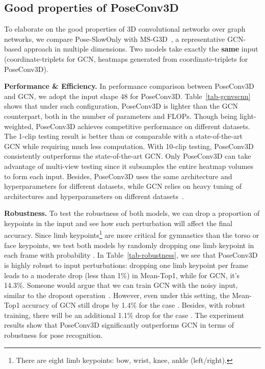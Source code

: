 \subsection{Good properties of PoseConv3D}
To elaborate on the good properties of 3D convolutional networks over graph networks, we compare Pose-SlowOnly with MS-G3D~\cite{liu2020disentangling}, a representative GCN-based approach in multiple dimensions.
Two models take exactly the \textbf{same} input (coordinate-triplets for GCN, heatmaps generated from coordinate-triplets for PoseConv3D). 

\noindent\textbf{Performance \& Efficiency.}
In performance comparison between PoseConv3D and GCN, 
we adopt the input shape 48 for PoseConv3D.
Table~\ref{tab-gcnvscnn} shows that under such configuration,
PoseConv3D is lighter than the GCN counterpart, both in the number of parameters and FLOPs.
Though being light-weighted, PoseConv3D achieves competitive performance on different datasets.
The 1-clip testing result is better than or comparable with a state-of-the-art GCN while requiring much less computation.
With 10-clip testing, PoseConv3D consistently outperforms the state-of-the-art GCN.
Only PoseConv3D can take advantage of multi-view testing since it subsamples the entire heatmap volumes to form each input.
Besides, PoseConv3D uses the same architecture and hyperparameters for different datasets, 
while GCN relies on heavy tuning of architectures and hyperparameters on different datasets~\cite{liu2020disentangling}.

\noindent
\textbf{Robustness.} 
To test the robustness of both models, we can drop a proportion of keypoints in the input and see how such perturbation will affect the final accuracy.
Since limb keypoints\footnote{There are eight limb keypoints: bow, wrist, knee, ankle (left/right).} 
are more critical for gymnastics than the torso or face keypoints, 
we test both models by randomly dropping one limb keypoint in each frame with probability .
In Table~\ref{tab-robustness}, we see that PoseConv3D is highly robust to input perturbations:
dropping one limb keypoint per frame leads to a moderate drop (less than 1\%) in Mean-Top1,
while for GCN, it's 14.3\%. 
Someone would argue that we can train GCN with the noisy input, 
similar to the dropout operation~\cite{srivastava2014dropout}.
However, even under this setting, the Mean-Top1 accuracy of GCN still drops by 1.4\% for the case .
Besides, with robust training, there will be an additional 1.1\% drop for the case .
The experiment results show that PoseConv3D significantly outperforms GCN in terms of robustness for pose recognition.

